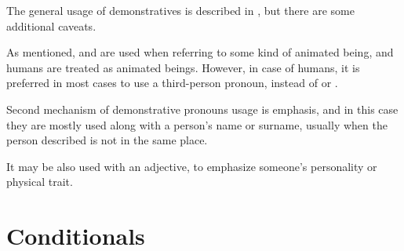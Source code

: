 The general usage of demonstratives is described in , but there
are some additional caveats.

As mentioned,  and  are used when referring to some kind
of animated being, and humans are treated as animated beings. However, in case
of humans, it is preferred in most cases to use a third-person pronoun, instead
of  or .



Second mechanism of demonstrative pronouns usage is emphasis, and in this case
they are mostly used along with a person's name or surname, usually when the
person described is not in the same place.


It may be also used with an adjective, to emphasize someone's personality or
physical trait.


\section{Conditionals}
\label{sec:conditionals}






